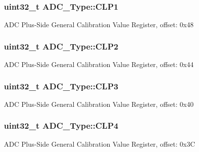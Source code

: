 \subsubsection[{\texorpdfstring{C\+L\+P1}{CLP1}}]{ uint32\+\_\+t A\+D\+C\+\_\+\+Type\+::\+C\+L\+P1}\hypertarget{structADC__Type_a4d46f571d82c5c84402ed9df3ebf0f2d}{}\label{structADC__Type_a4d46f571d82c5c84402ed9df3ebf0f2d}
A\+DC Plus-\/\+Side General Calibration Value Register, offset\+: 0x48 
\subsubsection[{\texorpdfstring{C\+L\+P2}{CLP2}}]{ uint32\+\_\+t A\+D\+C\+\_\+\+Type\+::\+C\+L\+P2}\hypertarget{structADC__Type_a57aa0df779b5b476d8b4cd498e11a07d}{}\label{structADC__Type_a57aa0df779b5b476d8b4cd498e11a07d}
A\+DC Plus-\/\+Side General Calibration Value Register, offset\+: 0x44 
\subsubsection[{\texorpdfstring{C\+L\+P3}{CLP3}}]{ uint32\+\_\+t A\+D\+C\+\_\+\+Type\+::\+C\+L\+P3}\hypertarget{structADC__Type_a1452eb8d202a03a390a021a8ed791698}{}\label{structADC__Type_a1452eb8d202a03a390a021a8ed791698}
A\+DC Plus-\/\+Side General Calibration Value Register, offset\+: 0x40 
\subsubsection[{\texorpdfstring{C\+L\+P4}{CLP4}}]{ uint32\+\_\+t A\+D\+C\+\_\+\+Type\+::\+C\+L\+P4}\hypertarget{structADC__Type_a3b8cdaa5f3bc728ac9ade1e50a536b18}{}\label{structADC__Type_a3b8cdaa5f3bc728ac9ade1e50a536b18}
A\+DC Plus-\/\+Side General Calibration Value Register, offset\+: 0x3C 
